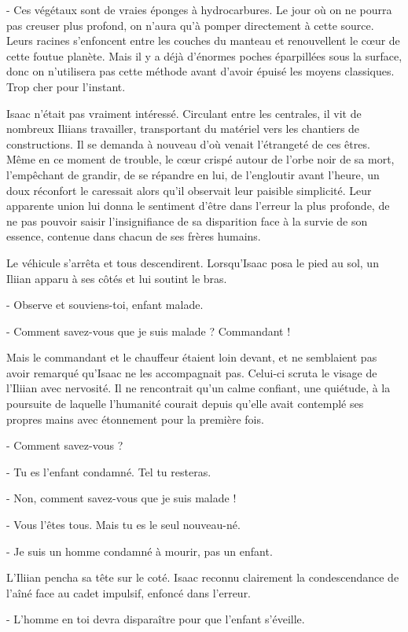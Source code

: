 \documentclass[12pt]{book}
\begin{document}
- Ces végétaux sont de vraies éponges à hydrocarbures. Le jour où on ne pourra pas creuser plus profond, on n’aura qu’à pomper directement à cette source. Leurs racines s’enfoncent entre les couches du manteau et renouvellent le cœur de cette foutue planète. Mais il y a déjà d'énormes poches éparpillées sous la surface, donc on n’utilisera pas cette méthode avant d’avoir épuisé les moyens classiques. Trop cher pour l’instant.


Isaac n’était pas vraiment intéressé. Circulant entre les centrales, il vit de nombreux Iliians travailler, transportant du matériel vers les chantiers de constructions. Il se demanda à nouveau d’où venait l’étrangeté de ces êtres. Même en ce moment de trouble, le cœur crispé autour de l’orbe noir de sa mort, l’empêchant de grandir, de se répandre en lui, de l’engloutir avant l’heure, un doux réconfort le caressait alors qu’il observait leur paisible simplicité. Leur apparente union lui donna le sentiment d’être dans l’erreur la plus profonde, de ne pas pouvoir saisir l’insignifiance de sa disparition face à la survie de son essence, contenue dans chacun de ses frères humains.


Le véhicule s’arrêta et tous descendirent. Lorsqu’Isaac posa le pied au sol, un Iliian apparu à ses côtés et lui soutint le bras.

-  Observe et souviens-toi, enfant malade.

-  Comment savez-vous que je suis malade ? Commandant !


Mais le commandant et le chauffeur étaient loin devant, et ne semblaient pas avoir remarqué qu’Isaac ne les accompagnait pas. Celui-ci scruta le visage de l’Iliian avec nervosité. Il ne rencontrait qu’un calme confiant, une quiétude, à la poursuite de laquelle l’humanité courait depuis qu’elle avait contemplé ses propres mains avec étonnement pour la première fois.


-  Comment savez-vous ?

-  Tu es l’enfant condamné. Tel tu resteras.

-  Non, comment savez-vous que je suis malade !

-  Vous l’êtes tous. Mais tu es le seul nouveau-né.

-  Je suis un homme condamné à mourir, pas un enfant.


L’Iliian pencha sa tête sur le coté. Isaac reconnu clairement la condescendance de l’aîné face au cadet impulsif, enfoncé dans l’erreur.


-  L’homme en toi devra disparaître pour que l’enfant s’éveille.
\end{document}
